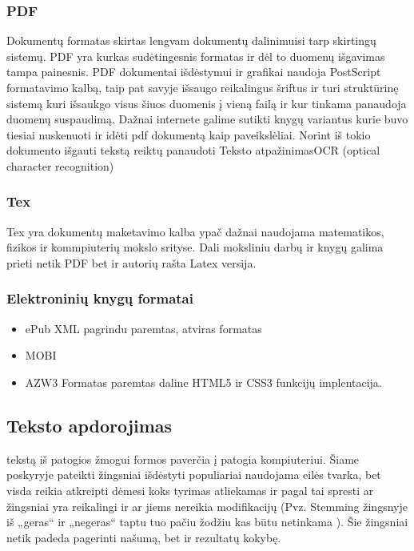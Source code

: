 \documentclass{VUMIFInfKursinis}
\begin{document}
\subsubsection{PDF}
 Dokumentų formatas skirtas lengvam dokumentų dalinimuisi tarp skirtingų sistemų. PDF yra kurkas sudėtingesnis formatas ir dėl to duomenų išgavimas tampa painesnis. PDF dokumentai išdėstymui ir grafikai naudoja PostScript formatavimo kalbą, taip pat savyje išsaugo reikalingus šriftus ir turi struktūrinę sistemą kuri išsaukgo visus šiuos duomenis į vieną failą ir kur tinkama panaudoja duomenų suspaudimą.
Dažnai internete galime sutikti knygų variantus kurie buvo tiesiai nuskenuoti ir idėti pdf dokumentą kaip paveikslėliai. Norint iš tokio dokumento išgauti tekstą reiktų panaudoti {Teksto atpažinimas}{OCR (optical character recognition)}

\subsubsection{Tex}
Tex yra dokumentų maketavimo kalba ypač dažnai naudojama matematikos, fizikos ir kommpiuterių mokslo srityse. Dali moksliniu darbų ir knygų galima prieti netik PDF bet ir autorių rašta Latex versija.

\subsubsection{Elektroninių knygų formatai}
\begin{itemize}
	\item ePub
		XML pagrindu paremtas, atviras formatas
	\item MOBI

	\item AZW3
		Formatas paremtas daline HTML5 ir CSS3 funkcijų implentacija. 
\end{itemize}

\subsection{Teksto apdorojimas}
 tekstą iš patogios žmogui formos paverčia į patogia kompiuteriui. Šiame poskyryje pateikti žingsniai išdėstyti populiariai naudojama eilės tvarka, bet visda reikia atkreipti dėmesi koks tyrimas atliekamas ir pagal tai spresti ar žingsniai yra reikalingi ir ar jiems nereikia modifikacijų (Pvz. Stemming žingsnyje iš „geras“ ir „negeras“ taptu tuo pačiu žodžiu kas būtu netinkama ). Šie žingsniai netik padeda pagerinti našumą, bet ir rezultatų kokybę\cite{mugunthadevi2011survey}.
\end{document}

